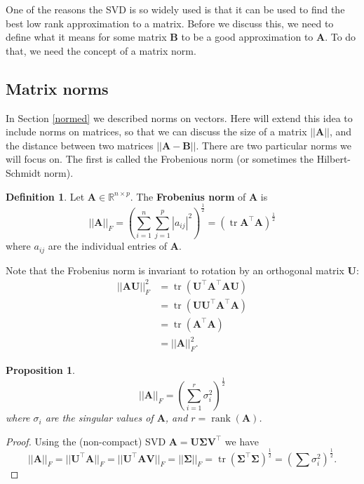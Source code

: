 \documentclass[]{book}
\newtheorem{proposition}{Proposition}[chapter]
\theoremstyle{definition}
\newtheorem{definition}{Definition}[chapter]
\theoremstyle{definition}
\theoremstyle{definition}
\theoremstyle{remark}
\begin{document}
One of the reasons the SVD is so widely used is that it can be used to find the best low rank approximation to a matrix. Before we discuss this, we need to define what it means for some matrix \(\mathbf B\) to be a good approximation to \(\mathbf A\). To do that, we need the concept of a matrix norm.

\hypertarget{matrix-norms}{%
\subsection{Matrix norms}\label{matrix-norms}}

In Section \ref{normed} we described norms on vectors. Here will extend this idea to include norms on matrices, so that we can discuss the size of a matrix \(||\mathbf A||\), and the distance between two matrices \(||\mathbf A-\mathbf B||\). There are two particular norms we will focus on. The first is called the Frobenious norm (or sometimes the Hilbert-Schmidt norm).

\begin{definition}
\protect\hypertarget{def:frobenius}{}{\label{def:frobenius} }Let \(\mathbf A\in \mathbb{R}^{n\times p}\). The \textbf{Frobenius norm} of \(\mathbf A\) is
\[||\mathbf A||_F = \left(\sum_{i=1}^n\sum_{j=1}^p |a_{ij}|^2\right)^{\frac{1}{2}}=(\operatorname{tr}\mathbf A^\top\mathbf A)^{\frac{1}{2}}  
\]
where \(a_{ij}\) are the individual entries of \(\mathbf A\).
\end{definition}

Note that the Frobenius norm is invariant to rotation by an orthogonal matrix \(\mathbf U\):
\begin{align*}
 ||\mathbf A\mathbf U||_F^2 &= \operatorname{tr}(\mathbf U^\top \mathbf A^\top \mathbf A\mathbf U)\\
 &=\operatorname{tr}(\mathbf U\mathbf U^\top \mathbf A^\top \mathbf A)\\
 &= \operatorname{tr}(\mathbf A^\top\mathbf A)\\
 &= ||\mathbf A||_F^2.
\end{align*}

\begin{proposition}
\protect\hypertarget{prp:frob}{}{\label{prp:frob} }\[||\mathbf A||_F = \left(\sum_{i=1}^r \sigma_i^2\right)^{\frac{1}{2}}\]
where \(\sigma_i\) are the singular values of \(\mathbf A\), and \(r = \operatorname{rank}(\mathbf A)\).
\end{proposition}

\begin{proof}
{}Using the (non-compact) SVD
\(\mathbf A= \mathbf U\boldsymbol{\Sigma}\mathbf V^\top\)
we have \[||\mathbf A||_F=||\mathbf U^\top \mathbf A||_F = ||\mathbf U^\top \mathbf A\mathbf V||_F = ||\boldsymbol{\Sigma}||_F=\operatorname{tr}(\boldsymbol{\Sigma}^\top\boldsymbol{\Sigma})^\frac{1}{2}=\left(\sum \sigma_i^2 \right)^\frac{1}{2}.\]
\end{proof}
\end{document}
